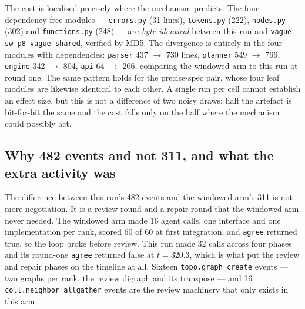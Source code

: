 \documentclass[11pt]{article}
\begin{document}
The cost is localised precisely where the mechanism predicts. The four dependency-free modules
--- \texttt{errors.py} (31 lines), \texttt{tokens.py} (222), \texttt{nodes.py} (302) and
\texttt{functions.py} (248) --- are \emph{byte-identical} between this run and
\texttt{vague-sw-p8-vague-shared}, verified by MD5. The divergence is entirely in the four modules
with dependencies: \texttt{parser} 437 $\rightarrow$ 730 lines, \texttt{planner} 549
$\rightarrow$ 766, \texttt{engine} 342 $\rightarrow$ 804, \texttt{api} 64 $\rightarrow$ 206,
comparing the windowed arm to this run at round one. The same pattern holds for the precise-spec
pair, whose four leaf modules are likewise identical to each other. A single run per cell cannot
establish an effect size, but this is not a difference of two noisy draws: half the artefact is
bit-for-bit the same and the cost falls only on the half where the mechanism could possibly act.

\subsection{Why 482 events and not 311, and what the extra activity was}

The difference between this run's 482 events and the windowed arm's 311 is not more negotiation.
It is a review round and a repair round that the windowed arm never needed. The windowed arm made
16 agent calls, one interface and one implementation per rank, scored 60 of 60 at first
integration, and \texttt{agree} returned true, so the loop broke before review. This run made 32
calls across four phases and its round-one \texttt{agree} returned false at $t = 320.3$, which is
what put the review and repair phases on the timeline at all. Sixteen \texttt{topo.graph\_create}
events --- two graphs per rank, the review digraph and its transpose --- and 16
\texttt{coll.neighbor\_allgather} events are the review machinery that only exists in this arm.
\end{document}
